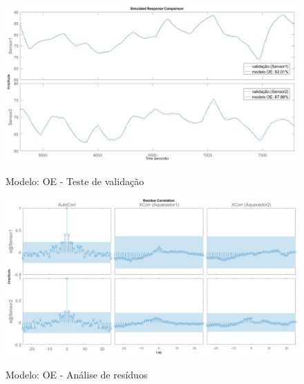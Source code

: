 \begin{apendicesenv}
\begin{figure}
	\caption{Modelo: OE - Teste de validação}
	\begin{center}
		\includegraphics[width=1.00\textwidth]{./5_images/tclabsp-models-OE-compare.png} 
		\label{fig:tclabsp-models-oe-compare}
	\end{center}
	\centering
\end{figure}

\begin{figure}
	\caption{Modelo: OE - Análise de resíduos}
	\begin{center}
		\includegraphics[width=1.00\textwidth]{./5_images/tclabsp-models-OE-resid.png} 
		\label{fig:tclabsp-models-oe-resid}
	\end{center}
	\centering
\end{figure}


\end{apendicesenv}
